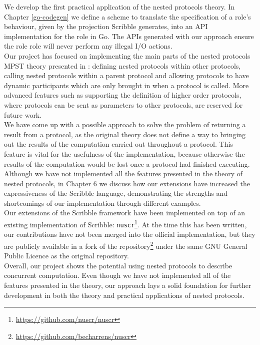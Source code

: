 \documentclass[12pt,twoside]{report}
\begin{document}
We develop the first practical application of the nested protocols theory. In Chapter \ref{go-codegen} we define a scheme to translate the specification of a role's behaviour, given by the projection Scribble generates, into an API implementation for the role in Go. The APIs generated with our approach ensure the role role will never perform any illegal I/O actions.\\

Our project has focused on implementing the main parts of the nested protocols MPST theory presented in \cite{nestedprotocols}: defining nested protocols within other protocols, calling nested protocols within a parent protocol and allowing protocols to have dynamic participants which are only brought in when a protocol is called. More advanced features such as supporting the definition of higher order protocols, where protocols can be sent as parameters to other protocols, are reserved for future work.\\

We have come up with a possible approach to solve the problem of returning a result from a protocol, as the original theory does not define a way to bringing out the results of the computation carried out throughout a protocol. This feature is vital for the usefulness of the implementation, because otherwise the results of the computation would be lost once a protocol had finished executing.\\

Although we have not implemented all the features presented in the theory of nested protocols, in Chapter 6 we discuss how our extensions have increased the expressiveness of the Scribble language, demonstrating the strengths and shortcomings of our implementation through different examples.\\

Our extensions of the Scribble framework have been implemented on top of an existing implementation of Scribble: \texttt{nuscr}\footnote{\href{https://github.com/nuscr/nuscr}{https://github.com/nuscr/nuscr}}. At the time this has been written, our contributions have not been merged into the official implementation, but they are publicly available in a fork of the repository\footnote{\href{https://github.com/becharrens/nuscr}{https://github.com/becharrens/nuscr}} under the same GNU General Public Licence as the original repository.\\

Overall, our project shows the potential using nested protocols to describe concurrent computation. Even though we have not implemented all of the features presented in the theory, our approach lays a solid foundation for further development in both the theory and practical applications of nested protocols.
\end{document}
